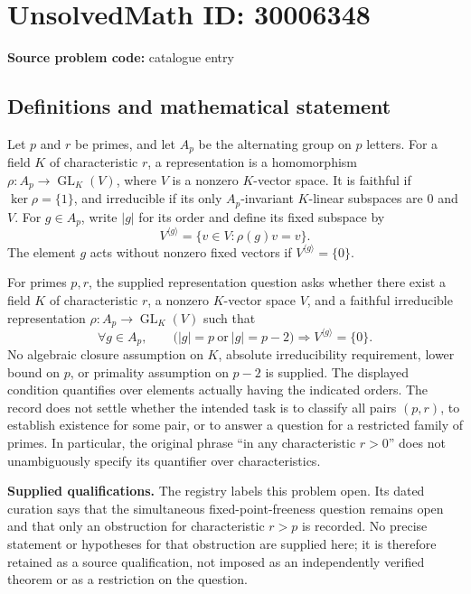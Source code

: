 \documentclass[11pt]{article}
\begin{document}
\section*{UnsolvedMath ID: 30006348}
\textbf{Source problem code:} catalogue entry
\subsection{Definitions and mathematical statement}
Let \(p\) and \(r\) be primes, and let \(A_p\) be the alternating group on \(p\) letters. For a field \(K\) of characteristic \(r\), a representation is a homomorphism \(\rho\colon A_p\to\operatorname{GL}_K(V)\), where \(V\) is a nonzero \(K\)-vector space. It is faithful if \(\ker\rho=\{1\}\), and irreducible if its only \(A_p\)-invariant \(K\)-linear subspaces are \(0\) and \(V\). For \(g\in A_p\), write \(|g|\) for its order and define its fixed subspace by
\[
V^{\langle g\rangle}=\{v\in V:\rho(g)v=v\}.
\]
The element \(g\) acts without nonzero fixed vectors if \(V^{\langle g\rangle}=\{0\}\).

For primes \(p,r\), the supplied representation question asks whether there exist a field \(K\) of characteristic \(r\), a nonzero \(K\)-vector space \(V\), and a faithful irreducible representation \(\rho\colon A_p\to\operatorname{GL}_K(V)\) such that
\[
\forall g\in A_p,\qquad
\bigl(|g|=p\ \text{or}\ |g|=p-2\bigr)
\Longrightarrow V^{\langle g\rangle}=\{0\}.
\]
No algebraic closure assumption on \(K\), absolute irreducibility requirement, lower bound on \(p\), or primality assumption on \(p-2\) is supplied. The displayed condition quantifies over elements actually having the indicated orders. The record does not settle whether the intended task is to classify all pairs \((p,r)\), to establish existence for some pair, or to answer a question for a restricted family of primes. In particular, the original phrase ``in any characteristic \(r>0\)'' does not unambiguously specify its quantifier over characteristics.

\textbf{Supplied qualifications.} The registry labels this problem open. Its dated curation says that the simultaneous fixed-point-freeness question remains open and that only an obstruction for characteristic \(r>p\) is recorded. No precise statement or hypotheses for that obstruction are supplied here; it is therefore retained as a source qualification, not imposed as an independently verified theorem or as a restriction on the question.
\end{document}
